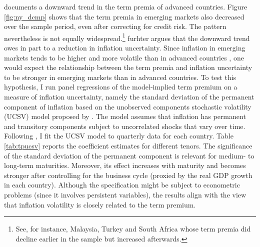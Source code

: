 {\cite{Wright:2011} documents a downward trend in the term premia of advanced countries.
Figure \ref{fig:ny_dcmp} shows that the term premia in emerging markets also decreased over the sample period, even after correcting for credit risk. The pattern nevertheless is not equally widespread.\footnote{ See, for instance, Malaysia, Turkey and South Africa whose term premia did decline earlier in the sample but increased afterwards.}
\cite{Wright:2011} furhter argues that the downward trend 
owes in part to a reduction in inflation uncertainty.
Since inflation in emerging markets tends to be higher and more volatile than in advanced countries \citep{HaKoseOhnsorge:2019}, one would expect the relationship between the term premia and inflation uncertainty to be stronger in emerging markets than in advanced countries.
To test this hypothesis, I run panel regressions of the model-implied term premium on a measure of inflation uncertainty, namely the standard deviation of the permanent component of inflation based on the unobserved components stochastic volatility (UCSV) model proposed by \cite{StockWatson:2007}. 
The model assumes that inflation has permanent and transitory components subject to uncorrelated shocks that vary over time.
Following \cite{Wright:2011}, I fit the UCSV model to quarterly data for each country.
Table \ref{tab:tpucsv} reports the coefficient estimates for different tenors.
The significance of the standard deviation of the permanent component is relevant for medium- to long-term maturities.
Moreover, its effect increases with maturity and becomes stronger after controlling for the business cycle (proxied by the real GDP growth in each country).
Although the specification might be subject to econometric problems (since it involves persistent variables), the results align with the view that inflation volatility is closely related to the term premium.

}
